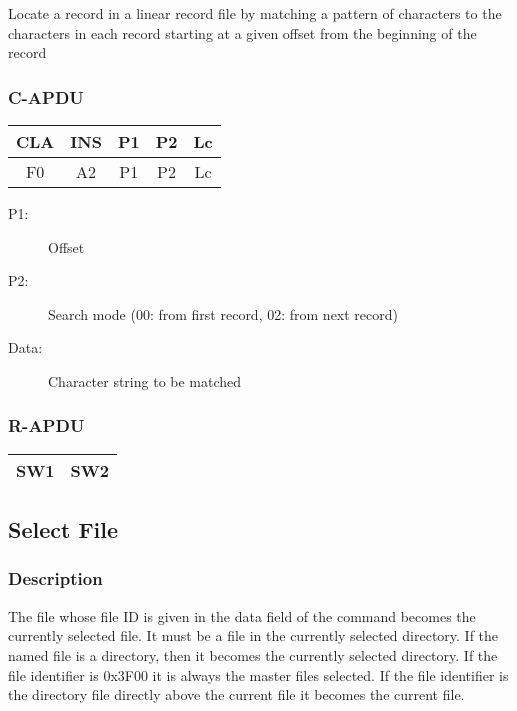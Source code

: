 \documentclass[a4paper,oneside]{article}
\begin{document}
Locate a record in a linear record file by matching a pattern of
characters to the characters in each record starting at a given
offset from the beginning of the record

\subsubsection*{C-APDU}

\begin{tabular}{|c|c|c|c|c|} \hline
CLA & INS & P1 & P2 & Lc \\ \hline \hline
F0 & A2 & P1 & P2 & Lc \\ \hline
\end{tabular}

\begin{description}
\item[P1:] Offset
\item[P2:] Search mode (00: from first record, 02: from next record)
\item[Data:] Character string to be matched
\end{description}

\subsubsection*{R-APDU}

\begin{tabular}{|c|c|} \hline
SW1 & SW2 \\ \hline
\end{tabular}


\subsection{Select File}

\subsubsection*{Description}

The file whose file ID is given in the data field of the command becomes
the currently selected file. It must be a file in the currently selected
directory. If the named file is a directory, then it becomes the currently
selected directory. If the file identifier is 0x3F00 it is always the
master files selected. If the file identifier is the directory file
directly above the current file it becomes the current file.
\end{document}
